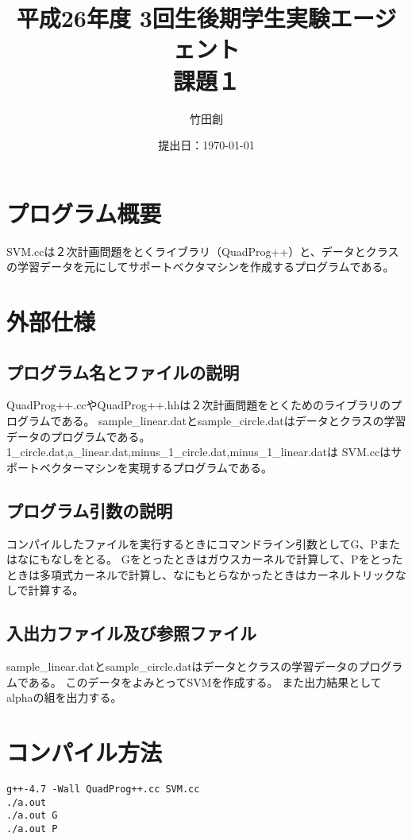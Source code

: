 \documentclass[a4paper,12pt]{jarticle}
\title{平成26年度 3回生後期学生実験エージェント \\ 課題１}
\author{竹田創}
\date{提出日：\today  \\ }
\begin{document}
\maketitle

\section{プログラム概要}
\lstset{numbers=left,basicstyle=\small}
SVM.ccは２次計画問題をとくライブラリ（QuadProg++）と、データとクラスの学習データを元にしてサポートベクタマシンを作成するプログラムである。
\section{外部仕様}

\subsection{プログラム名とファイルの説明}

QuadProg++.ccやQuadProg++.hhは２次計画問題をとくためのライブラリのプログラムである。
sample\_linear.datとsample\_circle.datはデータとクラスの学習データのプログラムである。
1\_circle.dat,a\_linear.dat,minus\_1\_circle.dat,minus\_1\_linear.datは
SVM.ccはサポートベクターマシンを実現するプログラムである。



\subsection{プログラム引数の説明}
コンパイルしたファイルを実行するときにコマンドライン引数としてG、Pまたはなにもなしをとる。
Gをとったときはガウスカーネルで計算して、Pをとったときは多項式カーネルで計算し、なにもとらなかったときはカーネルトリックなしで計算する。

\subsection{入出力ファイル及び参照ファイル}
sample\_linear.datとsample\_circle.datはデータとクラスの学習データのプログラムである。
このデータをよみとってSVMを作成する。
また出力結果としてalphaの組を出力する。
\section{コンパイル方法}
\begin{verbatim}
g++-4.7 -Wall QuadProg++.cc SVM.cc
./a.out 
./a.out G
./a.out P

\end{verbatim}
\end{document}
